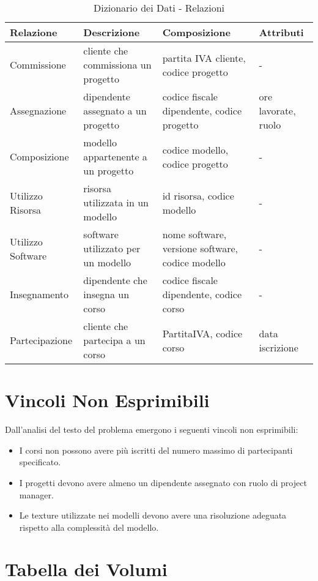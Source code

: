 \documentclass[a4paper,11pt]{article}
\begin{document}
{\begin{table}[h]
\centering
\begin{tabular}{|p{3.5cm}|p{4cm}|p{5cm}|p{3cm}|}
\hline
\textbf{Relazione} & \textbf{Descrizione} & \textbf{Composizione} & \textbf{Attributi} \\
\hline
Commissione & cliente che commissiona un progetto & partita IVA cliente, codice progetto & - \\
\hline
Assegnazione & dipendente assegnato a un progetto & codice fiscale dipendente, codice progetto & ore lavorate, ruolo \\
\hline
Composizione & modello appartenente a un progetto & codice modello, codice progetto & - \\
\hline
Utilizzo Risorsa & risorsa utilizzata in un modello & id risorsa, codice modello & - \\
\hline
Utilizzo Software & software utilizzato per un modello & nome software, versione software, codice modello & - \\
\hline
Insegnamento & dipendente che insegna un corso & codice fiscale dipendente, codice corso & - \\
\hline
Partecipazione & cliente che partecipa a un corso & PartitaIVA, codice corso & data iscrizione \\
\hline
\end{tabular}
\caption{Dizionario dei Dati - Relazioni}
\end{table}

\section{Vincoli Non Esprimibili}
Dall'analisi del testo del problema emergono i seguenti vincoli non esprimibili:
\begin{itemize}
  \item I corsi non possono avere più iscritti del numero massimo di partecipanti specificato.
  \item I progetti devono avere almeno un dipendente assegnato con ruolo di project manager.
  \item Le texture utilizzate nei modelli devono avere una risoluzione adeguata rispetto alla complessità del modello.
\end{itemize}
\newpage


\section{Tabella dei Volumi}

}
\end{document}
